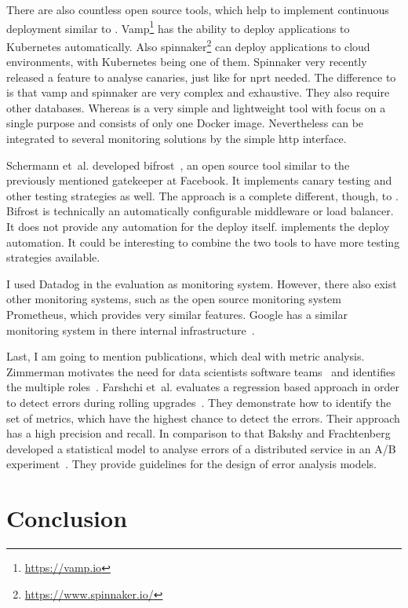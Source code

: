 There are also countless open source tools, which help to implement continuous deployment
similar to \deployer{}. Vamp\footnote{\url{https://vamp.io}} has the ability to deploy
applications to Kubernetes automatically. Also
spinnaker\footnote{\url{https://www.spinnaker.io/}} can deploy applications to cloud
environments, with Kubernetes being one of them. Spinnaker very recently released a
feature to analyse canaries, just like for \gls{nprt} needed. The difference to \deployer{}
is that vamp and spinnaker are very complex and exhaustive. They also require other
databases. Whereas \deployer{} is a very simple and lightweight tool with focus on a single
purpose and consists of only one Docker image. Nevertheless \deployer{} can be integrated to
several monitoring solutions by the simple \gls{http} interface.

Schermann et~al. developed bifrost~\cite{bifrost}, an open source tool similar to the
previously mentioned gatekeeper at Facebook. It implements canary testing and other
testing strategies as well. The approach is a complete different, though, to
\deployer{}. Bifrost is technically an automatically configurable middleware or
load balancer. It does not provide any automation for the deploy itself. \deployer{}
implements the deploy automation. It could be interesting to combine the two tools to have
more testing strategies available.

I used Datadog in the evaluation as monitoring system. However, there also exist other
monitoring systems, such as the open source monitoring system Prometheus, which provides
very similar features. Google has a similar monitoring system in there internal
infrastructure~\cite{sre_monitoring}.

Last, I am going to mention publications, which deal with metric analysis. Zimmerman
motivates the need for data scientists software teams~\cite{data_science_role2} and
identifies the multiple roles~\cite{data_science_role}. Farshchi et~al. evaluates a
regression based approach in order to detect errors during rolling
upgrades~\cite{anomaly_detection}. They demonstrate how to identify the set of metrics,
which have the highest chance to detect the errors. Their approach has a high precision
and recall. In comparison to that Bakshy and Frachtenberg developed a statistical model to
analyse errors of a distributed service in an A/B
experiment~\cite{error_analysis_of_distr_system}. They provide guidelines for the design
of error analysis models.

\chapter{Conclusion}
\label{chap:conclusion}

